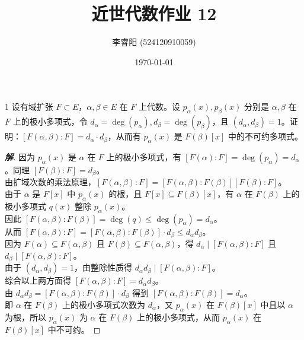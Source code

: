 \documentclass[12pt, a4paper]{article}
\title{近世代数作业 12}
\author{李睿阳 (524120910059)}
\date{\today}
\newenvironment{solution}{
    \begin{proof}[\textbf{解}]
}{
    \end{proof}
}
\begin{document}
\maketitle


\begin{problem}{1}
    设有域扩张 $F \subset E$，$\alpha, \beta \in E$ 在 $F$ 上代数。设 $p_{\alpha}(x), p_{\beta}(x)$ 分别是 $\alpha, \beta$ 在 $F$ 上的极小多项式，令 $d_{\alpha} = \deg(p_{\alpha}), d_{\beta} = \deg(p_{\beta})$，且 $(d_{\alpha}, d_{\beta}) = 1$。证明：$[F(\alpha, \beta) : F] = d_{\alpha} \cdot d_{\beta}$，从而有 $p_{\alpha}(x)$ 是 $F(\beta)[x]$ 中的不可约多项式。
\end{problem}
\begin{solution}
    因为 $p_{\alpha}(x)$ 是 $\alpha$ 在 $F$ 上的极小多项式，有 $[F(\alpha):F] = \deg(p_{\alpha}) = d_{\alpha}$。同理 $[F(\beta):F] = d_{\beta}$。\\
    由扩域次数的乘法原理，$[F(\alpha, \beta):F] = [F(\alpha, \beta):F(\beta)][F(\beta):F]$。\\
    由于 $\alpha$ 是 $F[x]$ 中 $p_{\alpha}(x)$ 的根，且 $F[x] \subseteq F(\beta)[x]$，有 $\alpha$ 在 $F(\beta)$ 上的极小多项式 $q(x)$ 整除 $p_{\alpha}(x)$。\\
    因此 $[F(\alpha, \beta):F(\beta)] = \deg(q) \leq \deg(p_{\alpha}) = d_{\alpha}$。\\
    从而 $[F(\alpha, \beta):F] = [F(\alpha, \beta):F(\beta)] \cdot d_{\beta} \leq d_{\alpha} d_{\beta}$。\\
    因为 $F(\alpha) \subseteq F(\alpha, \beta)$ 且 $F(\beta) \subseteq F(\alpha, \beta)$，得 $d_{\alpha} \mid [F(\alpha, \beta):F]$ 且 $d_{\beta} \mid [F(\alpha, \beta):F]$。\\
    由于 $(d_{\alpha}, d_{\beta}) = 1$，由整除性质得 $d_{\alpha} d_{\beta} \mid [F(\alpha, \beta):F]$。\\
    综合以上两方面得 $[F(\alpha, \beta):F] = d_{\alpha} d_{\beta}$。\\
    由 $d_{\alpha} d_{\beta} = [F(\alpha, \beta):F(\beta)] \cdot d_{\beta}$ 得到 $[F(\alpha, \beta):F(\beta)] = d_{\alpha}$。\\
    即 $\alpha$ 在 $F(\beta)$ 上的极小多项式次数为 $d_{\alpha}$，又 $p_{\alpha}(x)$ 在 $F(\beta)[x]$ 中且以 $\alpha$ 为根，所以 $p_{\alpha}(x)$ 为 $\alpha$ 在 $F(\beta)$ 上的极小多项式，从而 $p_{\alpha}(x)$ 在 $F(\beta)[x]$ 中不可约。
\end{solution}
\end{document}
